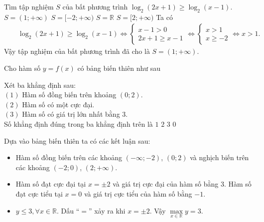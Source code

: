 \begin{ex}%
 Tìm tập nghiệm $S$ của bất phương trình $\log_2(2x+1) \geq \log_2(x-1)$.
 \choice
  {\True $S=(1;+\infty)$}
  {$S=[-2;+\infty)$}
  {$S=\mathbb{R}$}
  {$S=[2;+\infty)$}
 \loigiai
  {
  Ta có
  \begin{eqnarray*}
   & & \log_2(2x+1) \geq \log_2(x-1) \Leftrightarrow \begin{cases} x-1 > 0 \\ 2x+1 \geq x-1 \end{cases} \Leftrightarrow \begin{cases} x>1 \\ x \geq -2 \end{cases} \Leftrightarrow x>1.
  \end{eqnarray*}
  Vậy tập nghiệm của bất phương trình đã cho là $S = (1;+\infty)$.
  }
\end{ex}


\begin{ex}%
 Cho hàm số $y=f(x)$ có bảng biến thiên như sau
 \begin{center}
 \end{center}
 Xét ba khẳng định sau:\\
 $(1)$ Hàm số đồng biến trên khoảng $(0;2)$.\\
 $(2)$ Hàm số có một cực đại.\\
 $(3)$ Hàm số có giá trị lớn nhất bằng $3$.\\
 Số khẳng định đúng trong ba khẳng định trên là
 \choice
  {$1$}
  {$2$}
  {\True $3$}
  {$0$}
 \loigiai
  {
  Dựa vào bảng biến thiên ta có các kết luận sau:
  \begin{itemize}
   \item Hàm số đồng biến trên các khoảng $(-\infty;-2)$, $(0;2)$ và nghịch biến trên các khoảng $(-2;0)$, $(2;+\infty)$.
   \item Hàm số đạt cực đại tại $x=\pm 2$ và giá trị cực đại của hàm số bằng $3$. Hàm số đạt cực tiểu tại $x=0$ và giá trị cực tiểu của hàm số bằng $-1$.
   \item $y \leq 3, \forall x \in \mathbb{R}$. Dấu ``$=$'' xảy ra khi $x=\pm 2$. Vậy $\max\limits_{x \in \mathbb{R}} y = 3$.
  \end{itemize}
  }
\end{ex}



